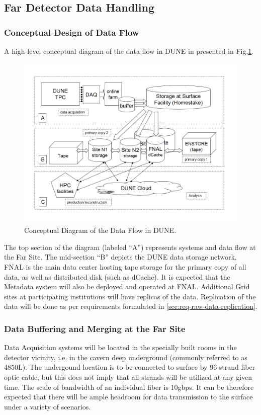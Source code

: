 \subsection{Far Detector Data Handling}
\subsubsection{Conceptual Design of Data Flow}
A high-level conceptual diagram of the data flow in DUNE in presented in Fig.\ref{fig:DUNEdataflow}.
\begin{figure}[h!]
\centering
\includegraphics[width=\textwidth]{DUNEdataflow.png}
\caption{Conceptual Diagram of the Data Flow in DUNE.}
\label{fig:DUNEdataflow}
\end{figure}

\noindent
The top section of the diagram (labeled ``A'') represents systems and data flow at the Far Site.
The mid-section ``B'' depicts the DUNE data storage network. FNAL is the main data center
hosting tape storage for the primary copy of all data, as well as distributed disk (such as dCache).
It is expected that the Metadata system will also be deployed and operated at FNAL.
Additional Grid sites at participating institutions will have replicas of the data.
Replication of the data will be done as per requirements formulated in \ref{sec:req-raw-data-replication}.

\subsubsection{Data Buffering and Merging at the Far Site}
Data Acquisition systems will be located in the specially built rooms in the detector vicinity,
i.e. in the cavern deep underground (commonly referred to as 4850L). The undergound location is to be
connected to surface by 96-strand fiber optic cable, but this does not imply that all strands will be
utilized at any given time. The scale of bandwidth of an individual fiber is 10gbps. It can be therefore
expected that there will be ample headroom for data transmission to the surface under a variety of scenarios.

